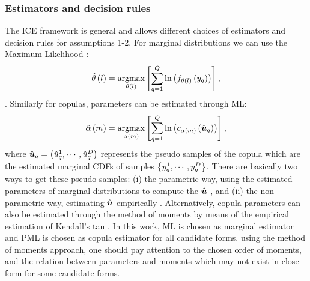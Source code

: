 \subsubsection{Estimators and decision rules}
\label{sec:Estimators and decision rules}
The ICE framework is general and allows different choices of estimators and decision rules for assumptions 1-2. For marginal distributions we can use the Maximum Likelihood :
\begin{equation}
    \label{eq:marginal estimator}
    \hat{\theta}\seq{l}=\argmax{\blueC{\theta\seq{l}}}\interv{\sum_{q=1}^Q \Ln \seq{f_{\theta\seq{l}}\seq{y_q}}},
\end{equation}
 \cite{fujimaki2011online}. Similarly for copulas, parameters can be estimated through ML:
\begin{equation}
    \label{eq:copula estimator}
    \hat{\alpha}\seq{m}=\argmax{\blueC{\alpha\seq{m}}}\interv{\sum_{q=1}^Q\Ln\seq{ c_{\alpha\seq{m}}\seq{\hat{\u}_q}}},
\end{equation}
where $\hat{\boldsymbol{u}}_q = \left(\hat{u}_q^1,\cdots,\hat{u}_q^D\right)$ represents the pseudo samples of the copula which are the estimated marginal CDFs of samples $\left\{y_q^1,\cdots,y_q^D\right\}$. There are basically two ways to get these pseudo samples: (i) the parametric way, using the estimated parameters of marginal distributions to compute the $\hat{\boldsymbol{u}}$ , and (ii) the non-parametric way, estimating $\hat{\boldsymbol{u}}$ empirically . 
Alternatively, copula parameters can also be estimated through the method of moments by means
of the empirical estimation of Kendall’s tau \cite{kendall1938new}. 
In this work, ML is chosen as marginal estimator and PML is chosen as copula estimator for all candidate forms.  using the method of moments approach, one should pay attention to the chosen order of moments, and the relation between parameters and moments which may not exist in close form for some candidate forms.

